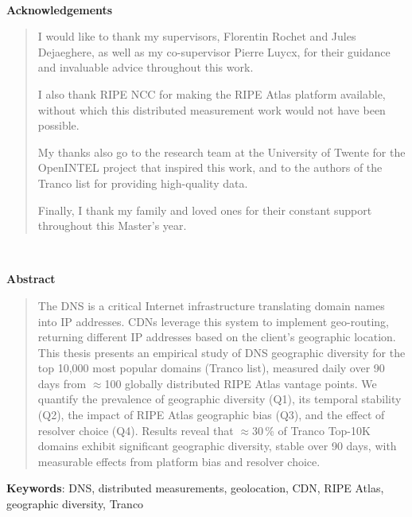 \documentclass[a4paper,11pt]{book}
\begin{document}

\justifying
\pagestyle{empty}
\onehalfspacing

\clearpage\newpage\hbox{ }\clearpage\newpage

\noindent\textbf{\huge Acknowledgements}

\bigskip

\begin{quote}
I would like to thank my supervisors, Florentin Rochet and Jules Dejaeghere, as well as my co-supervisor Pierre Luycx, for their guidance and invaluable advice throughout this work.

I also thank RIPE NCC for making the RIPE Atlas platform available, without which this distributed measurement work would not have been possible.

My thanks also go to the research team at the University of Twente for the OpenINTEL project that inspired this work, and to the authors of the Tranco list for providing high-quality data.

Finally, I thank my family and loved ones for their constant support throughout this Master's year.
\end{quote}

\clearpage\newpage\hbox{ }\clearpage\newpage

\noindent\textbf{\huge Abstract}
\bigskip

\begin{quote}
The DNS is a critical Internet infrastructure translating domain names into IP addresses. CDNs leverage this system to implement geo-routing, returning different IP addresses based on the client's geographic location. This thesis presents an empirical study of DNS geographic diversity for the top 10,000 most popular domains (Tranco list), measured daily over 90 days from $\approx$100 globally distributed RIPE Atlas vantage points. We quantify the prevalence of geographic diversity (Q1), its temporal stability (Q2), the impact of RIPE Atlas geographic bias (Q3), and the effect of resolver choice (Q4). Results reveal that $\approx$30\,\% of Tranco Top-10K domains exhibit significant geographic diversity, stable over 90 days, with measurable effects from platform bias and resolver choice.
\end{quote}

\bigskip
\noindent\textbf{Keywords}: DNS, distributed measurements, geolocation, CDN, RIPE Atlas, geographic diversity, Tranco
\end{document}
